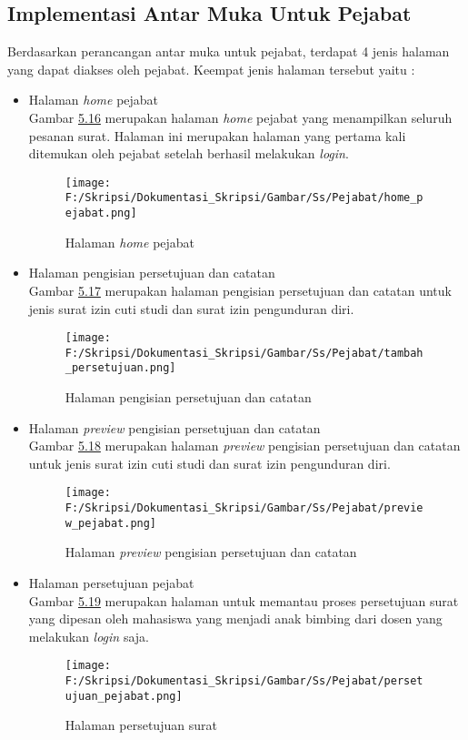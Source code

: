 \subsection{Implementasi Antar Muka Untuk Pejabat}
\label{sec:implementasi_antar_muka_pejabat}
Berdasarkan perancangan antar muka untuk pejabat, terdapat 4 jenis halaman yang dapat diakses oleh pejabat. Keempat jenis halaman tersebut yaitu :
\begin{itemize}
	\item Halaman \textit{home} pejabat\\
	 Gambar \hyperlink{halaman_home_pejabat}{5.16} merupakan halaman \textit{home} pejabat yang menampilkan seluruh pesanan surat. Halaman ini merupakan halaman yang pertama kali ditemukan oleh pejabat setelah berhasil melakukan \textit{login}.
	 \begin{figure}[H]
	\centering
		\texttt{[image: F:/Skripsi/Dokumentasi\_Skripsi/Gambar/Ss/Pejabat/home\_pejabat.png]}
		\caption{Halaman \textit{home} pejabat}
		\label{fig:halaman_home_pejabat}
	\end{figure}
	
	\item Halaman pengisian persetujuan dan catatan\\
	 Gambar \hyperlink{halaman_persetujuan_dan_catatan}{5.17} merupakan halaman pengisian persetujuan dan catatan untuk jenis surat izin cuti studi dan surat izin pengunduran diri.
	 \begin{figure}[H]
	\centering
		\texttt{[image: F:/Skripsi/Dokumentasi\_Skripsi/Gambar/Ss/Pejabat/tambah\_persetujuan.png]}
		\caption{Halaman pengisian persetujuan dan catatan}
		\label{fig:halaman_persetujuan_dan_catatan}
	\end{figure}
	
	\item Halaman \textit{preview} pengisian persetujuan dan catatan\\
	 Gambar \hyperlink{halaman_preview_persetujuan_dan_catatan}{5.18} merupakan halaman \textit{preview} pengisian persetujuan dan catatan untuk jenis surat izin cuti studi dan surat izin pengunduran diri.
	 \begin{figure}[H]
	\centering
		\texttt{[image: F:/Skripsi/Dokumentasi\_Skripsi/Gambar/Ss/Pejabat/preview\_pejabat.png]}
		\caption{Halaman \textit{preview} pengisian persetujuan dan catatan}
		\label{fig:halaman_preview_persetujuan_dan_catatan}
	\end{figure}
	
	\item Halaman persetujuan pejabat\\
	 Gambar \hyperlink{halaman_persetujuan_surat}{5.19} merupakan halaman untuk memantau proses persetujuan surat yang dipesan oleh mahasiswa yang menjadi anak bimbing dari dosen yang melakukan \textit{login} saja.
	 \begin{figure}[H]
	\centering
		\texttt{[image: F:/Skripsi/Dokumentasi\_Skripsi/Gambar/Ss/Pejabat/persetujuan\_pejabat.png]}
		\caption{Halaman persetujuan surat}
		\label{fig:halaman_persetujuan_surat}
	\end{figure}
\end{itemize}


